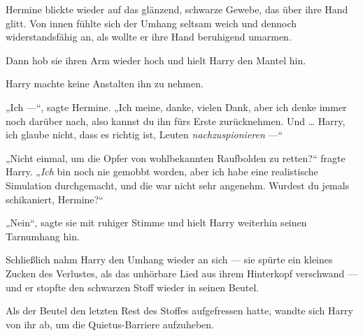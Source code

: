 Hermine blickte wieder auf das glänzend, schwarze Gewebe, das über ihre Hand glitt. Von innen fühlte sich der Umhang seltsam weich und dennoch widerstandsfähig an, als wollte er ihre Hand beruhigend umarmen.

Dann hob sie ihren Arm wieder hoch und hielt Harry den Mantel hin.

Harry machte keine Anstalten ihn zu nehmen.

„Ich —“, sagte Hermine.
„Ich meine, danke, vielen Dank, aber ich denke immer noch darüber nach, also kannst du ihn fürs Erste zurücknehmen. Und … Harry, ich glaube nicht, dass es richtig ist, Leuten \emph{nachzuspionieren} —“

„Nicht einmal, um die Opfer von wohlbekannten Raufbolden zu retten?“ fragte Harry.
„\emph{Ich} bin noch nie gemobbt worden, aber ich habe eine realistische Simulation durchgemacht, und die war nicht sehr angenehm. Wurdest du jemals schikaniert, Hermine?“

„Nein“, sagte sie mit ruhiger Stimme und hielt Harry weiterhin seinen Tarnumhang hin.

Schließlich nahm Harry den Umhang wieder an sich — sie spürte ein kleines Zucken des Verlustes, als das unhörbare Lied aus ihrem Hinterkopf verschwand — und er stopfte den schwarzen Stoff wieder in seinen Beutel.

Als der Beutel den letzten Rest des Stoffes aufgefressen hatte, wandte sich Harry von ihr ab, um die Quietus-Barriere aufzuheben.

